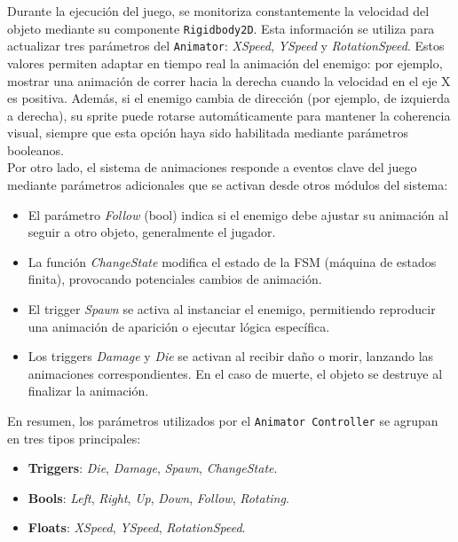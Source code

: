 Durante la ejecución del juego, se monitoriza constantemente la velocidad del objeto mediante su componente \texttt{Rigidbody2D}. Esta información se utiliza para actualizar tres parámetros del \texttt{Animator}: \textit{XSpeed}, \textit{YSpeed} y \textit{RotationSpeed}. Estos valores permiten adaptar en tiempo real la animación del enemigo: por ejemplo, mostrar una animación de correr hacia la derecha cuando la velocidad en el eje X es positiva. Además, si el enemigo cambia de dirección (por ejemplo, de izquierda a derecha), su sprite puede rotarse automáticamente para mantener la coherencia visual, siempre que esta opción haya sido habilitada mediante parámetros booleanos.\\

Por otro lado, el sistema de animaciones responde a eventos clave del juego mediante parámetros adicionales que se activan desde otros módulos del sistema:

\begin{itemize}
	\item El parámetro \textit{Follow} (bool) indica si el enemigo debe ajustar su animación al seguir a otro objeto, generalmente el jugador.
	\item La función \textit{ChangeState} modifica el estado de la FSM (máquina de estados finita), provocando potenciales cambios de animación.
	\item El trigger \textit{Spawn} se activa al instanciar el enemigo, permitiendo reproducir una animación de aparición o ejecutar lógica específica.
	\item Los triggers \textit{Damage} y \textit{Die} se activan al recibir daño o morir, lanzando las animaciones correspondientes. En el caso de muerte, el objeto se destruye al finalizar la animación.
\end{itemize}

En resumen, los parámetros utilizados por el \texttt{Animator Controller} se agrupan en tres tipos principales:

\begin{itemize}
	\item \textbf{Triggers}: \textit{Die}, \textit{Damage}, \textit{Spawn}, \textit{ChangeState}.
	\item \textbf{Bools}: \textit{Left}, \textit{Right}, \textit{Up}, \textit{Down}, \textit{Follow}, \textit{Rotating}.
	\item \textbf{Floats}: \textit{XSpeed}, \textit{YSpeed}, \textit{RotationSpeed}.
\end{itemize}

